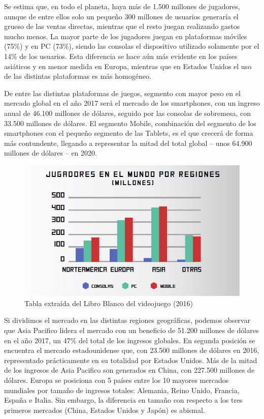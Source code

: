 Se estima que, en todo el planeta, haya más de 1.500 millones de jugadores, aunque de entre ellos solo un pequeño 300 millones de usuarios generaría el grueso de las ventas directas, mientras que el resto juegan realizando gastos mucho menos. La mayor parte de los jugadores juegan en plataformas móviles (75\%) y en PC (73\%), siendo las consolas el dispositivo utilizado solamente por el 14\% de los usuarios. Esta diferencia se hace aún más evidente en los países asiáticos y en menor medida en Europa, mientras que en Estados Unidos el uso de las distintas plataformas es más homogéneo.

De entre las distintas plataformas de juegos, segmento con mayor peso en el mercado global en el año 2017 será el mercado de los smartphones, con un ingreso anual de 46.100 millones de dólares, seguido por las consolas de sobremesa, con 33.500 millones de dólares. El segmento Mobile, combinación del segmento de los smartphones con el pequeño segmento de las Tablets, es el que crecerá de forma más contundente, llegando a representar la mitad del total global – unos 64.900 millones de dólares – en 2020.

\begin{figure}[h]
     \centering
     \includegraphics[width=0.8\linewidth]{images/estadodelarte/mercado/jugadores-por-region}
     \caption{Tabla extraída del Libro Blanco del videojuego (2016)}
\end{figure}

Si dividimos el mercado en las distintas regiones geográficas, podemos observar que Asia Pacifico lidera el mercado con un beneficio de 51.200 millones de dólares en el año 2017, un 47\% del total de los ingresos globales. En segunda posición se encuentra el mercado estadounidense que, con 23.500 millones de dólares en 2016, representado prácticamente en su totalidad por Estados Unidos. Más de la mitad de los ingresos de Asia Pacifico son generados en China, con 227.500 millones de dólares. Europa se posiciona con 5 países entre los 10 mayores mercados mundiales por tamaño de ingresos totales: Alemania, Reino Unido, Francia, España e Italia. Sin embargo, la diferencia en tamaño con respecto a los tres primeros mercados (China, Estados Unidos y Japón) es abismal. 

